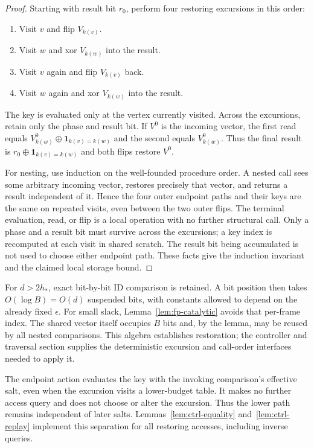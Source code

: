 \begin{proof}
Starting with result bit $r_0$, perform four restoring excursions in this order:
\begin{enumerate}
\item Visit $v$ and flip $V_{k(v)}$.
\item Visit $w$ and xor $V_{k(w)}$ into the result.
\item Visit $v$ again and flip $V_{k(v)}$ back.
\item Visit $w$ again and xor $V_{k(w)}$ into the result.
\end{enumerate}
The key is evaluated only at the vertex currently visited. Across the excursions, retain only the phase and result bit.  If $V^0$ is the incoming vector, the first
read equals $V^0_{k(w)}\mathbin\oplus\mathbf1_{k(v)=k(w)}$ and the
second equals $V^0_{k(w)}$.  Thus the final result is
$r_0\mathbin\oplus\mathbf1_{k(v)=k(w)}$ and both flips restore $V^0$.

For nesting, use induction on the well-founded procedure order.  A
nested call sees some arbitrary incoming vector, restores precisely
that vector, and returns a result independent of it.  Hence the four
outer endpoint paths and their keys are the same on repeated visits,
even between the two outer flips.  The terminal evaluation, read, or
flip is a local operation with no further structural call.  Only a
phase and a result bit must survive across the excursions; a key index
is recomputed at each visit in shared scratch.  The result bit being
accumulated is not used to choose either endpoint path.  These facts
give the induction invariant and the claimed local storage bound.
\end{proof}

For $d>2h_*$, exact bit-by-bit ID comparison is retained.  A bit position
then takes $O(\log B)=O(d)$ suspended bits, with constants allowed to
depend on the already fixed $\epsilon$.  For small slack,
Lemma~\ref{lem:fp-catalytic} avoids that per-frame index.  The shared
vector itself occupies $B$ bits and, by the lemma, may be reused by all
nested comparisons.  This algebra establishes restoration; the
controller and traversal section supplies the deterministic excursion
and call-order interfaces needed to apply it.

The endpoint action evaluates the key with the invoking comparison's
effective salt, even when the excursion visits a lower-budget table.
It makes no further access query and does not choose or alter the
excursion.  Thus the lower path remains independent of later salts.
Lemmas~\ref{lem:ctrl-equality} and~\ref{lem:ctrl-replay} implement this
separation for all restoring accesses, including inverse queries.


